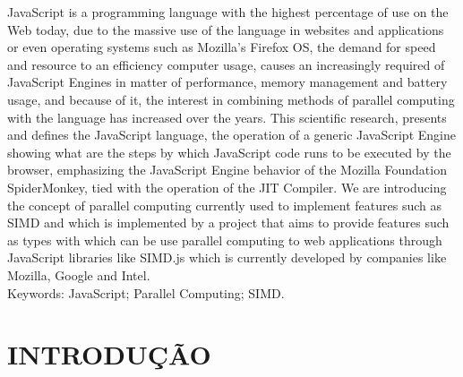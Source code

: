 \documentclass[12pt,a4paper]{article}
\begin{document}
JavaScript is a programming language with the highest percentage of use on the Web today, due to the massive use of the language in websites and applications or even operating systems such as Mozilla's Firefox OS, the demand for speed and resource to an efficiency computer usage, causes an increasingly required of JavaScript Engines in matter of performance, memory management and battery usage, and because of it, the interest in combining methods of parallel computing with the language has increased over the years. This scientific research, presents and defines the JavaScript language, the operation of a generic JavaScript Engine showing what are the steps by which JavaScript code runs to be executed by the browser, emphasizing the JavaScript Engine behavior of the Mozilla Foundation SpiderMonkey, tied with the operation of the JIT Compiler. We are introducing the concept of parallel computing currently used to implement features such as SIMD and which is implemented by a project that aims to provide features such as types with which can be use parallel computing to web applications through JavaScript libraries like SIMD.js which is currently developed by companies like Mozilla, Google and Intel. \\
Keywords: JavaScript; Parallel Computing; SIMD.


\section{INTRODUÇÃO}
\label{sec:section3}
\end{document}
